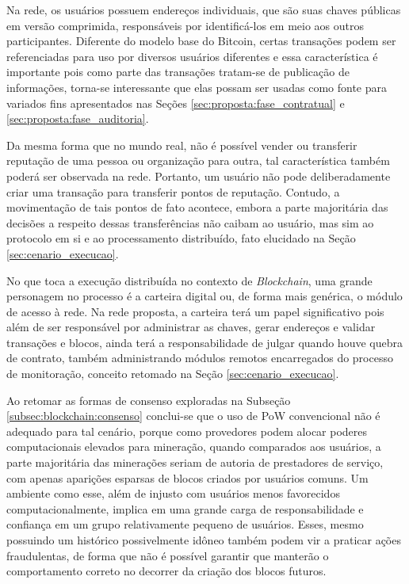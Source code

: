 %
Na rede, os usuários possuem endereços individuais, que são suas chaves públicas em versão comprimida, responsáveis por identificá-los em meio aos outros participantes. Diferente do modelo base do Bitcoin, certas transações podem ser referenciadas para uso por diversos usuários diferentes e essa característica é importante pois como parte das transações tratam-se de publicação de informações, torna-se interessante que elas possam ser usadas como fonte para variados fins apresentados nas Seções \ref{sec:proposta:fase_contratual} e \ref{sec:proposta:fase_auditoria}.

%
Da mesma forma que no mundo real, não é possível vender ou transferir reputação de uma pessoa ou organização para outra, tal característica também poderá ser observada na rede. Portanto, um usuário não pode deliberadamente criar uma transação para transferir pontos de reputação. Contudo, a movimentação de tais pontos de fato acontece, embora a parte majoritária das decisões a respeito dessas transferências não caibam ao usuário, mas sim ao protocolo em si e ao processamento distribuído, fato elucidado na Seção \ref{sec:cenario_execucao}.

%
No que toca a execução distribuída no contexto de \textit{Blockchain}, uma grande personagem no processo é a carteira digital ou, de forma mais genérica, o módulo de acesso à rede. Na rede proposta, a carteira terá um papel significativo pois além de ser responsável por administrar as chaves, gerar endereços e validar transações e blocos, ainda terá a responsabilidade de julgar quando houve quebra de contrato, também administrando módulos remotos encarregados do processo de monitoração, conceito retomado na Seção \ref{sec:cenario_execucao}.

%
Ao retomar as formas de consenso exploradas na Subseção \ref{subsec:blockchain:consenso} conclui-se que o uso de \ac{PoW} convencional não é adequado para tal cenário, porque como provedores podem alocar poderes computacionais elevados para mineração, quando comparados aos usuários, a parte majoritária das minerações seriam de autoria de prestadores de serviço, com apenas aparições esparsas de blocos criados por usuários comuns. Um ambiente como esse, além de injusto com usuários menos favorecidos computacionalmente, implica em uma grande carga de responsabilidade e confiança em um grupo relativamente pequeno de usuários. Esses, mesmo possuindo um histórico possivelmente idôneo também podem vir a praticar ações fraudulentas, de forma que não é possível garantir que manterão o comportamento correto no decorrer da criação dos blocos futuros. 

